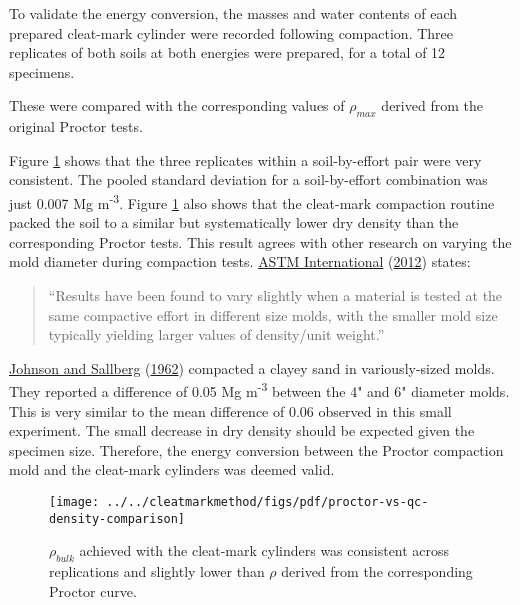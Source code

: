 \documentclass[
  letterpaper,
  openany]{book}
\renewenvironment{leftbar}{\def\FrameCommand{\color{grey30}\vrule width 1pt \hspace{10pt}}\MakeFramed {\advance\hsize-\width \FrameRestore}}{\endMakeFramed}
\renewenvironment{quote}%
{\begin{leftbar} \begin{quotation} \noindent \small }%
{\end{quotation}\end{leftbar}}
\begin{document}
To validate the energy conversion, the masses and water contents of each prepared cleat-mark cylinder were recorded following compaction.
Three replicates of both soils at both energies were prepared, for a total of 12 specimens.

These were compared with the corresponding values of \(\rho_{max}\) derived from the original Proctor tests.

Figure \ref{fig:proctor-vs-cleat-mark-achieved-density-fig} shows that the three replicates within a soil-by-effort pair were very consistent. The pooled standard deviation for a soil-by-effort combination was just 0.007 Mg m\textsuperscript{-3}.
Figure \ref{fig:proctor-vs-cleat-mark-achieved-density-fig} also shows that the cleat-mark compaction routine packed the soil to a similar but systematically lower dry density than the corresponding Proctor tests.
This result agrees with other research on varying the mold diameter during compaction tests.
\protect\hyperlink{ref-ASTMD698-12}{ASTM International} (\protect\hyperlink{ref-ASTMD698-12}{2012}) states:

\begin{quote}
``Results have been found to vary slightly when a material is tested at the same compactive effort in different size molds, with the smaller mold size typically yielding larger values of density/unit weight.''
\end{quote}

\protect\hyperlink{ref-Johnson1962}{Johnson and Sallberg} (\protect\hyperlink{ref-Johnson1962}{1962}) compacted a clayey sand in variously-sized molds.
They reported a difference of 0.05 Mg m\textsuperscript{-3} between the 4" and 6" diameter molds.
This is very similar to the mean difference of 0.06 observed in this small experiment.
The small decrease in dry density should be expected given the specimen size.
Therefore, the energy conversion between the Proctor compaction mold and the cleat-mark cylinders was deemed valid.

\begin{figure}

{\centering \texttt{[image: ../../cleatmarkmethod/figs/pdf/proctor-vs-qc-density-comparison]} 

}

\caption[$\rho_{max}$ for cleat-mark cylinders c.f. Proctor testing]{$\rho_{bulk}$ achieved with the cleat-mark cylinders was consistent across replications and slightly lower than $\rho$ derived from the corresponding Proctor curve.}\label{fig:proctor-vs-cleat-mark-achieved-density-fig}
\end{figure}
\end{document}
